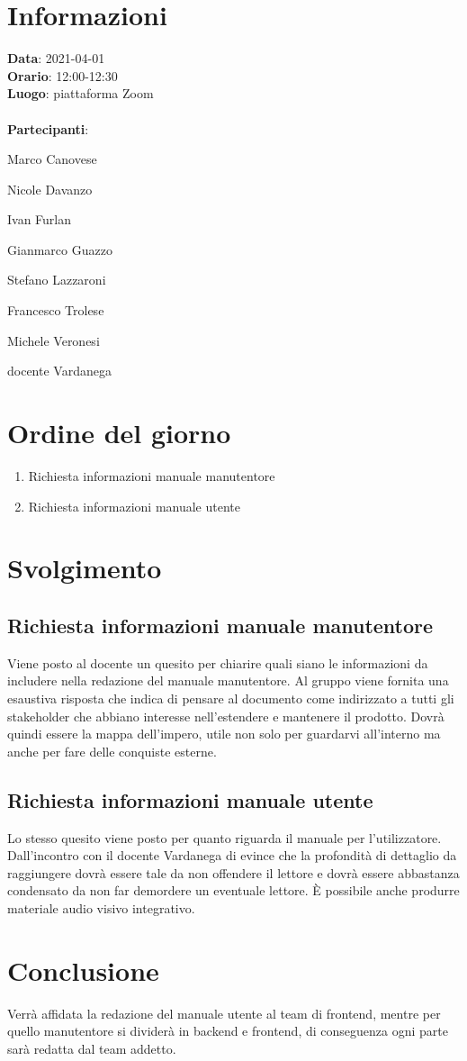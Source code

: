 \section{Informazioni}
\textbf{Data}: 2021-04-01 \\
\textbf{Orario}: 12:00-12:30\\
\textbf{Luogo}: piattaforma Zoom \\\\
\textbf{Partecipanti}:\begin{list}{*}{\setlength{\itemsep}{0cm}}
	\item Marco Canovese
	\item Nicole Davanzo
	\item Ivan Furlan
	\item Gianmarco Guazzo
	\item Stefano Lazzaroni
	\item Francesco Trolese
	\item Michele Veronesi
	\item docente Vardanega
\end{list}

\section{Ordine del giorno}
\begin{enumerate}
	\item Richiesta informazioni manuale manutentore
	\item Richiesta informazioni manuale utente
\end{enumerate}

\section{Svolgimento}
\subsection{Richiesta informazioni manuale manutentore}
Viene posto al docente un quesito per chiarire quali siano le informazioni da includere nella redazione del manuale manutentore.
Al gruppo viene fornita una esaustiva risposta che indica di pensare al documento come indirizzato a tutti gli stakeholder che
abbiano interesse nell'estendere e mantenere il prodotto. Dovrà quindi essere la mappa dell'impero, utile non solo per guardarvi all'interno
ma anche per fare delle conquiste esterne.

\subsection{Richiesta informazioni manuale utente}
Lo stesso quesito viene posto per quanto riguarda il manuale per l'utilizzatore. Dall'incontro con il docente Vardanega di evince che
la profondità di dettaglio da raggiungere dovrà essere tale da non offendere il lettore e dovrà essere abbastanza condensato da non far demordere
un eventuale lettore. È possibile anche produrre materiale audio visivo integrativo.

\section{Conclusione}
Verrà affidata la redazione del manuale utente al team di frontend, mentre per quello manutentore si dividerà in backend e frontend, di conseguenza ogni
parte sarà redatta dal team addetto.